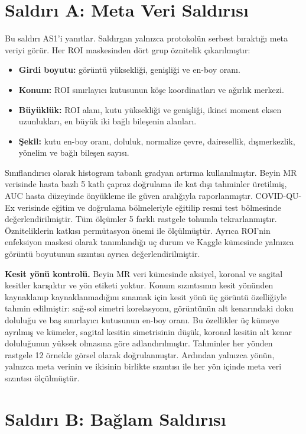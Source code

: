 \section{Saldırı A: Meta Veri Saldırısı}\label{sec:attackA}

Bu saldırı AS1'i yanıtlar. Saldırgan yalnızca protokolün serbest bıraktığı meta veriyi görür. Her ROI maskesinden dört grup öznitelik çıkarılmıştır:

\begin{itemize}
\item \textbf{Girdi boyutu:} görüntü yüksekliği, genişliği ve en-boy oranı.
\item \textbf{Konum:} ROI sınırlayıcı kutusunun köşe koordinatları ve ağırlık merkezi.
\item \textbf{Büyüklük:} ROI alanı, kutu yüksekliği ve genişliği, ikinci moment eksen uzunlukları, en büyük iki bağlı bileşenin alanları.
\item \textbf{Şekil:} kutu en-boy oranı, doluluk, normalize çevre, dairesellik, dışmerkezlik, yönelim ve bağlı bileşen sayısı.
\end{itemize}

Sınıflandırıcı olarak histogram tabanlı gradyan artırma kullanılmıştır. Beyin MR verisinde hasta bazlı 5 katlı çapraz doğrulama ile kat dışı tahminler üretilmiş, AUC hasta düzeyinde önyükleme ile güven aralığıyla raporlanmıştır. COVID-QU-Ex verisinde eğitim ve doğrulama bölmeleriyle eğitilip resmi test bölmesinde değerlendirilmiştir. Tüm ölçümler 5 farklı rastgele tohumla tekrarlanmıştır. Özniteliklerin katkısı permütasyon önemi ile ölçülmüştür. Ayrıca ROI'nin enfeksiyon maskesi olarak tanımlandığı uç durum ve Kaggle kümesinde yalnızca görüntü boyutunun sızıntısı ayrıca değerlendirilmiştir.

\textbf{Kesit yönü kontrolü.} Beyin MR veri kümesinde aksiyel, koronal ve sagital kesitler karışıktır ve yön etiketi yoktur. Konum sızıntısının kesit yönünden kaynaklanıp kaynaklanmadığını sınamak için kesit yönü üç görüntü özelliğiyle tahmin edilmiştir: sağ-sol simetri korelasyonu, görüntünün alt kenarındaki doku doluluğu ve baş sınırlayıcı kutusunun en-boy oranı. Bu özellikler üç kümeye ayrılmış ve kümeler, sagital kesitin simetrisinin düşük, koronal kesitin alt kenar doluluğunun yüksek olmasına göre adlandırılmıştır. Tahminler her yönden rastgele 12 örnekle görsel olarak doğrulanmıştır. Ardından yalnızca yönün, yalnızca meta verinin ve ikisinin birlikte sızıntısı ile her yön içinde meta veri sızıntısı ölçülmüştür.

\section{Saldırı B: Bağlam Saldırısı}\label{sec:attackB}

